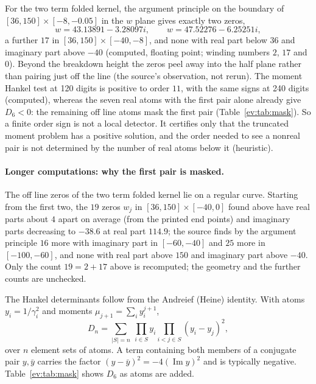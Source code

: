 For the two term folded kernel, the argument principle on the boundary of $[36,150]\times[-8,-0.05]$ in the $w$ plane gives exactly two zeros,
\[
w=43.13891-3.28097i,\qquad w=47.52276-6.25251i,
\]
a further $17$ in $[36,150]\times[-40,-8]$, and none with real part below $36$ and imaginary part above $-40$ (computed, floating point; winding numbers $2$, $17$ and $0$). Beyond the breakdown height the zeros peel away into the half plane rather than pairing just off the line (the source's observation, not rerun). The moment Hankel test at 120 digits is positive to order $11$, with the same signs at 240 digits (computed), whereas the seven real atoms with the first pair alone already give $D_6<0$: the remaining off line atoms mask the first pair (Table~\ref{ev:tab:mask}). So a finite order sign is not a local detector. It certifies only that the truncated moment problem has a positive solution, and the order needed to see a nonreal pair is not determined by the number of real atoms below it (heuristic).

\paragraph{Longer computations: why the first pair is masked.} The off line zeros of the two term folded kernel lie on a regular curve. Starting from the first two, the $19$ zeros $w_j$ in $[36,150]\times[-40,0]$ found above have real parts about $4$ apart on average (from the printed end points) and imaginary parts decreasing to $-38.6$ at real part $114.9$; the source finds by the argument principle $16$ more with imaginary part in $[-60,-40]$ and $25$ more in $[-100,-60]$, and none with real part above $150$ and imaginary part above $-40$. Only the count $19=2+17$ above is recomputed; the geometry and the further counts are unchecked.

The Hankel determinants follow from the Andreief (Heine) identity. With atoms $y_i=1/\gamma_i^2$ and moments $\mu_{j+1}=\sum_iy_i^{j+1}$,
\[
D_n=\sum_{|S|=n}\ \prod_{i\in S}y_i\prod_{i<j\in S}(y_i-y_j)^2,
\]
over $n$ element sets of atoms. A term containing both members of a conjugate pair $y,\bar y$ carries the factor $(y-\bar y)^2=-4(\operatorname{Im}y)^2$ and is typically negative. Table~\ref{ev:tab:mask} shows $D_6$ as atoms are added.

